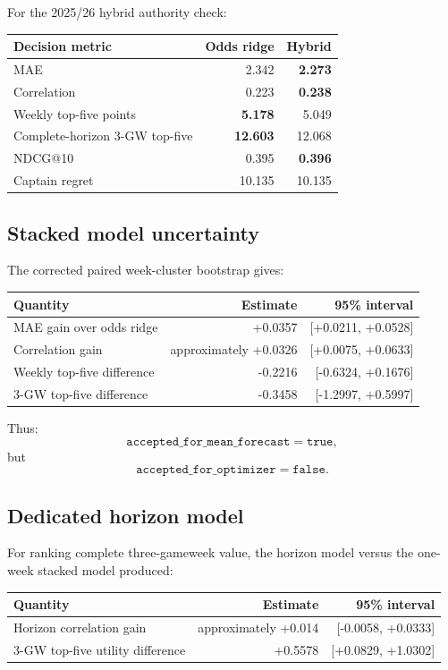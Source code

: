 \documentclass[11pt,a4paper]{article}
\begin{document}
For the 2025/26 hybrid authority check:
\begin{center}
\begin{tabular}{lrr}
\toprule
Decision metric & Odds ridge & Hybrid\\
\midrule
MAE & 2.342 & \textbf{2.273}\\
Correlation & 0.223 & \textbf{0.238}\\
Weekly top-five points & \textbf{5.178} & 5.049\\
Complete-horizon 3-GW top-five & \textbf{12.603} & 12.068\\
NDCG@10 & 0.395 & \textbf{0.396}\\
Captain regret & 10.135 & 10.135\\
\bottomrule
\end{tabular}
\end{center}

\subsection{Stacked model uncertainty}

The corrected paired week-cluster bootstrap gives:
\begin{center}
\begin{tabular}{lrr}
\toprule
Quantity & Estimate & 95\% interval\\
\midrule
MAE gain over odds ridge & +0.0357 & [+0.0211, +0.0528]\\
Correlation gain & approximately +0.0326 & [+0.0075, +0.0633]\\
Weekly top-five difference & -0.2216 & [-0.6324, +0.1676]\\
3-GW top-five difference & -0.3458 & [-1.2997, +0.5997]\\
\bottomrule
\end{tabular}
\end{center}

Thus:
\begin{equation}
  \texttt{accepted\_for\_mean\_forecast}=\texttt{true},
\end{equation}
but
\begin{equation}
  \texttt{accepted\_for\_optimizer}=\texttt{false}.
\end{equation}

\subsection{Dedicated horizon model}

For ranking complete three-gameweek value, the horizon model versus the one-week stacked model produced:
\begin{center}
\begin{tabular}{lrr}
\toprule
Quantity & Estimate & 95\% interval\\
\midrule
Horizon correlation gain & approximately +0.014 & [-0.0058, +0.0333]\\
3-GW top-five utility difference & +0.5578 & [+0.0829, +1.0302]\\
\bottomrule
\end{tabular}
\end{center}
\end{document}
